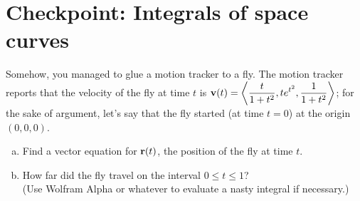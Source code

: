 


%


\allowdisplaybreaks
\section{Checkpoint: Integrals of space curves}

Somehow, you managed to glue a motion tracker to a fly. The motion tracker reports that the velocity of the fly at time $t$ is $\displaystyle\mathbf{v}(t) = \left\langle \frac{t}{1+t^2}, te^{t^2}, \frac{1}{1+t^2} \right\rangle$; for the sake of argument, let's say that the fly started (at time $t=0$) at the origin $(0,0,0)$.

\begin{enumerate}[(a)]
    \item Find a vector equation for $\mathbf{r}(t)$, the position of the fly at time $t$.
    \item How far did the fly travel on the interval $0\leq t \leq 1$? \\(Use Wolfram Alpha or whatever to evaluate a nasty integral if necessary.)
\end{enumerate}

	
